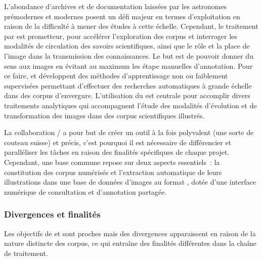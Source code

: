 L'abondance d'archives et de documentation laissées par les astronomes
prémodernes et modernes posent un défi majeur en termes d'exploitation
en raison de la difficulté à mener des études à cette échelle.
Cependant, le traitement par \ia est
prometteur, pour accélérer l'exploration des corpus et interroger les
modalités de circulation des savoirs scientifiques, ainsi que le rôle et
la place de l'image dans la transmission des connaissances. Le but est
de pouvoir donner du sens aux images en évitant au maximum les étape
manuelles d'annotation. Pour ce faire, \eida et \vhs développent des
méthodes d'apprentissage non ou faiblement supervisées permettant
d'effectuer des recherches automatiques à grande échelle dans des corpus
d'envergure. L'utilisation du \dl est centrale pour accomplir
divers traitements analytiques qui accompagnent l'étude des modalités
d'évolution et de transformation des images dans des corpus
scientifiques illustrés.

La collaboration \eida / \vhs a pour but de créer un outil à la fois
polyvalent (une sorte de couteau suisse) et précis, c'est pourquoi il
est nécessaire de différencier et paralléliser les tâches en raison des
finalités spécifiques de chaque projet. Cependant, une base commune
repose sur deux aspects essentiels~: la constitution des corpus
numérisés et l'extraction automatique de leurs illustrations dans une
base de données d'images au format \iiif, dotée d'une interface numérique
de consultation et d'annotation partagée.

\hypertarget{divergences-et-finalites}{%
\subsubsection{Divergences et finalités}\label{divergences-et-finalites}}

Les objectifs de \eida et \vhs sont proches mais des divergences
apparaissent en raison de la nature distincte des corpus, ce qui
entraîne des finalités différentes dans la chaîne de traitement.

